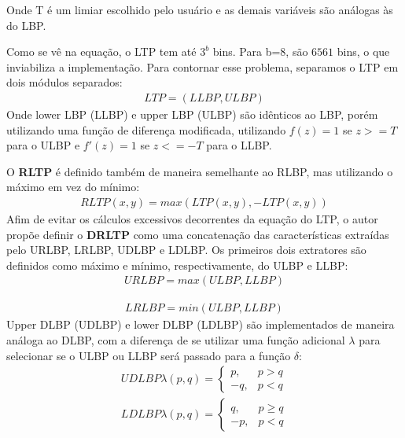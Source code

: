 \documentclass[a4paper,twocolumn]{article}
\begin{document}
Onde T é um limiar escolhido pelo usuário e as demais variáveis são análogas às do LBP.

Como se vê na equação, o LTP tem até $3^{b}$ bins. Para b=8, são $6561$ bins, o que inviabiliza a implementação. Para contornar esse problema, separamos o LTP em dois módulos separados: 
\begin{equation} \label{ltp_comp}
\begin{split}
LTP = (LLBP, ULBP)
\end{split}
\end{equation}
Onde lower LBP (LLBP) e upper LBP (ULBP) são idênticos ao LBP, porém utilizando uma função de diferença modificada, utilizando $f(z) = 1$ se $z>=T$ para o ULBP e $f'(z) = 1$ se $z<=-T$ para o LLBP.

O \textbf{RLTP} é definido também de maneira semelhante ao RLBP, mas utilizando o máximo em vez do mínimo:
\begin{equation} \label{rltp}
\begin{split}
RLTP(x,y) = max(LTP(x,y), -LTP(x,y))
\end{split}
\end{equation}
Afim de evitar os cálculos excessivos decorrentes da equação do LTP, o autor propõe definir o \textbf{DRLTP} como uma concatenação das características extraídas pelo URLBP, LRLBP, UDLBP e LDLBP. Os primeiros dois extratores são definidos como máximo e mínimo, respectivamente, do ULBP e LLBP:
\begin{equation} \label{urlbp}
\begin{split}
URLBP = max(ULBP, LLBP)
\end{split}
\end{equation}

\begin{equation} \label{lrlbp}
\begin{split}
LRLBP = min(ULBP, LLBP)
\end{split}
\end{equation}
Upper DLBP (UDLBP) e lower DLBP (LDLBP) são implementados de maneira análoga ao DLBP, com a diferença de se utilizar uma função adicional $\lambda$ para selecionar se o ULBP ou LLBP será passado para a função $\delta$:
\begin{equation} \label{lrlbp}
\begin{split}
UDLBP \lambda(p,q) = \begin{cases}p, & p > q\\-q, & p < q\end{cases} 
\\LDLBP \lambda(p,q) = \begin{cases}q, & p \geq q\\-p, & p < q\end{cases} 
\end{split}
\end{equation}
\end{document}
